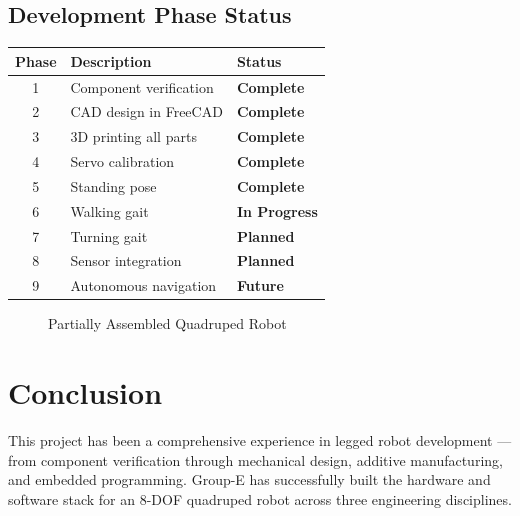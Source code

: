 \documentclass[12pt, a4paper]{article}
\begin{document}
\subsection{Development Phase Status}

\begin{center}
\begin{tabular}{|c|l|l|}
\hline
\textbf{Phase} & \textbf{Description} & \textbf{Status} \\
\hline
1 & Component verification        & \color{mygreen}\bfseries Complete \\
2 & CAD design in FreeCAD         & \color{mygreen}\bfseries Complete \\
3 & 3D printing all parts         & \color{mygreen}\bfseries Complete \\
4 & Servo calibration             & \color{mygreen}\bfseries Complete \\
5 & Standing pose                 & \color{mygreen}\bfseries Complete \\
6 & Walking gait                  & \color{myamber}\bfseries In Progress \\
7 & Turning gait                  & \color{myamber}\bfseries Planned \\
8 & Sensor integration            & \color{myamber}\bfseries Planned \\
9 & Autonomous navigation         & \color{myamber}\bfseries Future \\
\hline
\end{tabular}
\end{center}


\begin{figure}[H]
  \centering
  \vspace{10cm}
  \caption{Partially Assembled Quadruped Robot}
  \label{fig:assembly}
\end{figure}

\clearpage
\section{Conclusion}

This project has been a comprehensive experience in legged robot development ---
from component verification through mechanical design, additive manufacturing,
and embedded programming. Group-E has successfully built the hardware and
software stack for an 8-DOF quadruped robot across three engineering disciplines.
\end{document}
